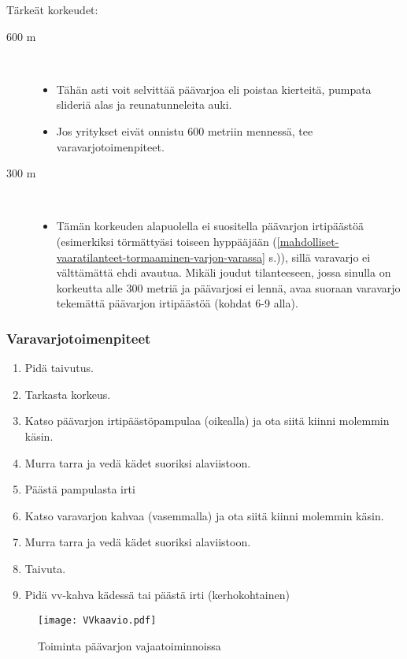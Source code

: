 Tärkeät korkeudet: 

\begin{description}
\item[ 600 m ] \hfill \\ 
	\begin{itemize}
	\item  Tähän asti voit selvittää päävarjoa eli poistaa kierteitä, pumpata slideriä alas ja reunatunneleita auki. 
	\item  Jos yritykset eivät onnistu 600 metriin mennessä, tee varavarjotoimenpiteet. 
	\end{itemize}
\item[ 300 m ] \hfill \\ 
	\begin{itemize}
	\item  Tämän korkeuden alapuolella ei suositella päävarjon irtipäästöä (esimerkiksi törmättyäsi toiseen hyppääjään (\ref{mahdolliset-vaaratilanteet-tormaaminen-varjon-varassa} s.\pageref{mahdolliset-vaaratilanteet-tormaaminen-varjon-varassa})), sillä varavarjo ei välttämättä ehdi avautua. Mikäli joudut tilanteeseen, jossa sinulla on korkeutta alle 300 metriä ja päävarjosi ei lennä, avaa suoraan varavarjo tekemättä päävarjon irtipäästöä (kohdat 6-9 alla). 
	\end{itemize}
\end{description}
\subsubsection{ Varavarjotoimenpiteet }
\label{paavarjon-vajaatoiminnot-varavarjotoimenpiteet}

\begin{enumerate}[label=\bfseries \arabic*)]
\item  Pidä taivutus. 
\item  Tarkasta korkeus. 
\item  Katso päävarjon irtipäästöpampulaa (oikealla) ja ota siitä kiinni molemmin käsin. 
\item  Murra tarra ja vedä kädet suoriksi alaviistoon.  
\item  Päästä pampulasta irti 
\item  Katso varavarjon kahvaa (vasemmalla) ja ota siitä kiinni molemmin käsin. 
\item  Murra tarra ja vedä kädet suoriksi alaviistoon. 
\item  Taivuta. 
\item  Pidä vv-kahva kädessä tai päästä irti (kerhokohtainen) 
\end{enumerate}

\begin{figure*}[]\centering\texttt{[image: VVkaavio.pdf]}\caption{Toiminta päävarjon vajaatoiminnoissa}\end{figure*} 

